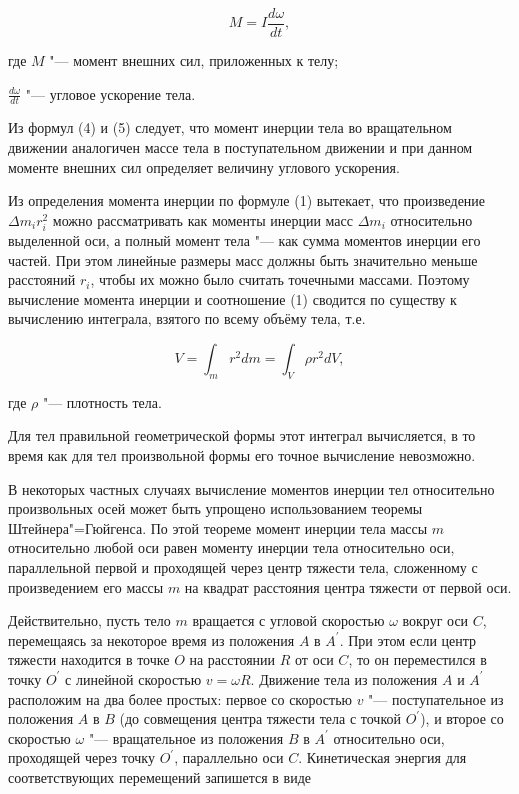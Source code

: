 \begin{equation}
    M = I\frac{d\omega}{dt}, 
\end{equation}

где $M$ "--- момент внешних сил, приложенных к телу;

$\frac{d\omega}{dt}$ "--- угловое ускорение тела.

Из формул (4) и (5) следует, что момент инерции тела во вращательном движении аналогичен массе тела в
поступательном движении и при данном моменте внешних сил определяет величину углового ускорения.

Из определения момента инерции по формуле (1) вытекает,
что произведение $\Delta m_ir_i^2$ можно рассматривать как моменты инерции масс $\Delta m_i$ относительно выделенной оси,
а полный момент тела "--- как сумма моментов инерции его частей. При этом линейные размеры масс должны быть значительно меньше расстояний $r_i$,
чтобы их можно было считать точечными массами. Поэтому вычисление момента инерции и соотношение (1) сводится по существу к вычислению интеграла,
взятого по всему объёму тела, т.е.

\begin{equation}
    V = \int_m r^2dm = \int_V \rho r^2 dV,
\end{equation}

где $\rho$  "--- плотность тела.

Для тел правильной геометрической формы этот интеграл вычисляется,
в то время как для тел произвольной формы его точное вычисление невозможно.

В некоторых частных случаях вычисление моментов инерции тел относительно
произвольных осей может быть упрощено использованием теоремы Штейнера"=Гюйгенса.
По этой теореме момент инерции тела массы $m$ относительно любой оси равен моменту инерции тела относительно оси,
параллельной первой и проходящей через центр тяжести тела,
сложенному с произведением его массы $m$ на квадрат расстояния центра тяжести от первой оси.

Действительно, пусть тело $m$ вращается с угловой скоростью $\omega$ вокруг оси $C$,
перемещаясь за некоторое время из положения $A$ в $A^{'}$.
При этом если центр тяжести находится в точке $O$ на расстоянии $R$ от оси $C$,
то он переместился в точку $O^{'}$ с линейной скоростью $v = \omega R$.
Движение тела из положения $A$ и $A^{'}$ расположим на два более простых:
первое со скоростью $v$ "--- поступательное из положения $A$ в $B$
(до совмещения центра тяжести тела с точкой $O^{'}$),
и второе со скоростью $\omega$ "--- вращательное из положения $B$ в $A^{'}$ относительно оси,
проходящей через точку $O^{'}$, параллельно оси $C$.
Кинетическая энергия для соответствующих перемещений запишется в виде


